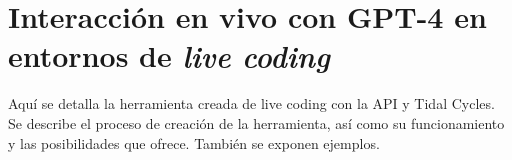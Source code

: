 \chapter{Interacción en vivo con GPT-4 en entornos de \textit{live coding}}

Aquí se detalla la herramienta creada de live coding con la API y Tidal Cycles. Se describe el proceso de creación de la herramienta, así como su funcionamiento y las posibilidades que ofrece. También se exponen ejemplos.